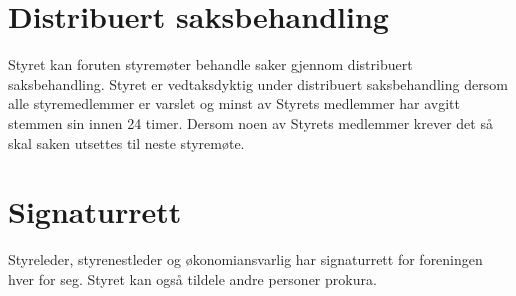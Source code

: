 \section{Distribuert saksbehandling}
Styret kan foruten styremøter behandle saker gjennom distribuert saksbehandling. Styret er vedtaksdyktig under distribuert saksbehandling dersom alle styremedlemmer er varslet og minst  av Styrets medlemmer har avgitt stemmen sin innen 24 timer. Dersom noen av Styrets medlemmer krever det så skal saken utsettes til neste styremøte.

\section{Signaturrett}
Styreleder, styrenestleder og økonomiansvarlig har signaturrett for foreningen hver for seg. Styret kan også tildele andre personer prokura.
